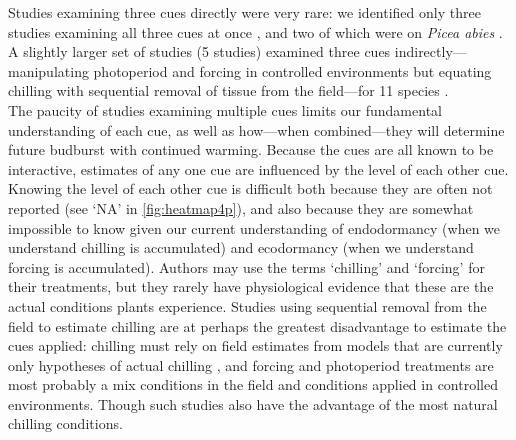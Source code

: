 \documentclass[11pt,letter]{article}
\begin{document}
Studies examining three cues directly were very rare: we identified only three studies examining all three cues at once \citep{Worrall:1967aa,Skuterud:1994aa,Sogaard:2008aa}, and two of which were on \emph{Picea abies} \citep{Worrall:1967aa,Sogaard:2008aa}. A slightly larger set of studies (5 studies) examined three cues indirectly---manipulating photoperiod and forcing in controlled environments but equating chilling with sequential removal of tissue from the field---for 11 species \citep{Schnabel:1987aa,Heide:1993,Partanen:1998aa,Basler:2014aa}. \\

The paucity of studies examining multiple cues limits our fundamental understanding of each cue, as well as how---when combined---they will determine future budburst with continued warming. Because the cues are all known to be interactive, estimates of any one cue are influenced by the level of each other cue. Knowing the level of each other cue is difficult both because they are often not reported (see `NA' in \ref{fig:heatmap4p}), and also because they are somewhat impossible to know given our current understanding of endodormancy (when we understand chilling is accumulated) and ecodormancy (when we understand forcing is accumulated). Authors may use the terms `chilling' and `forcing' for their treatments, but they rarely have physiological evidence that these are the actual conditions plants experience. Studies using sequential removal from the field to estimate chilling are at perhaps the greatest disadvantage to estimate the cues applied: chilling must rely on field estimates from models that are currently only hypotheses of actual chilling \citep{dennis2003}, and forcing and photoperiod treatments are most probably a mix conditions in the field and conditions applied in controlled environments. Though such studies also have the advantage of the most natural chilling conditions. \\%
\end{document}
